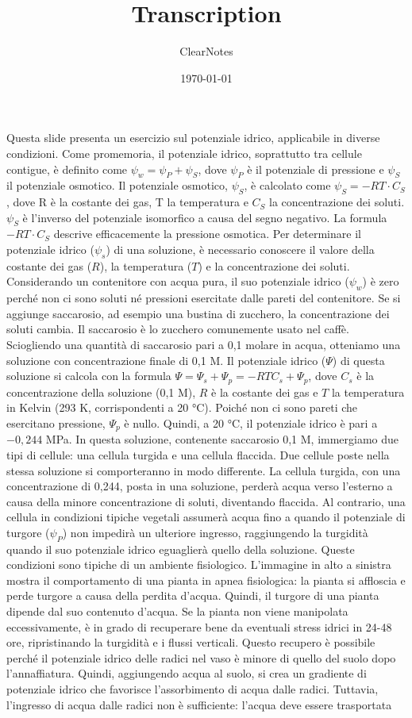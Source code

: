 \documentclass[11pt, a4paper]{article}
\title{Transcription}
\author{ClearNotes}
\date{\today}
\begin{document}
\maketitle
\begin{spacing}{1.15}
Questa slide presenta un esercizio sul potenziale idrico, applicabile in diverse condizioni. Come promemoria, il potenziale idrico, soprattutto tra cellule contigue, è definito come $\psi_w = \psi_P + \psi_S$, dove $\psi_P$ è il potenziale di pressione e $\psi_S$ il potenziale osmotico. Il potenziale osmotico, $\psi_S$, è calcolato come $\psi_S = -RT\cdot C_S$, dove R è la costante dei gas, T la temperatura e $C_S$ la concentrazione dei soluti.  $\psi_S$ è l'inverso del potenziale isomorfico a causa del segno negativo. La formula $-RT\cdot C_S$ descrive efficacemente la pressione osmotica. Per determinare il potenziale idrico ($\psi_s$) di una soluzione, è necessario conoscere il valore della costante dei gas ($R$), la temperatura ($T$) e la concentrazione dei soluti. Considerando un contenitore con acqua pura, il suo potenziale idrico ($\psi_w$) è zero perché non ci sono soluti né pressioni esercitate dalle pareti del contenitore. Se si aggiunge saccarosio, ad esempio una bustina di zucchero, la concentrazione dei soluti cambia. Il saccarosio è lo zucchero comunemente usato nel caffè. Sciogliendo una quantità di saccarosio pari a 0,1 molare in acqua, otteniamo una soluzione con concentrazione finale di 0,1 M. Il potenziale idrico ($\Psi$) di questa soluzione si calcola con la formula $\Psi = \Psi_s + \Psi_p = -RTC_s + \Psi_p$, dove $C_s$ è la concentrazione della soluzione (0,1 M), $R$ è la costante dei gas e $T$ la temperatura in Kelvin (293 K, corrispondenti a 20 °C).  Poiché non ci sono pareti che esercitano pressione, $\Psi_p$ è nullo. Quindi, a 20 °C, il potenziale idrico è pari a $-0,244$ MPa. In questa soluzione, contenente saccarosio 0,1 M, immergiamo due tipi di cellule: una cellula turgida e una cellula flaccida. Due cellule poste nella stessa soluzione si comporteranno in modo differente. La cellula turgida, con una concentrazione di 0,244, posta in una soluzione, perderà acqua verso l'esterno a causa della minore concentrazione di soluti, diventando flaccida. Al contrario, una cellula in condizioni tipiche vegetali assumerà acqua fino a quando il potenziale di turgore ($\psi_P$) non impedirà un ulteriore ingresso, raggiungendo la turgidità quando il suo potenziale idrico eguaglierà quello della soluzione. Queste condizioni sono tipiche di un ambiente fisiologico.  L'immagine in alto a sinistra mostra il comportamento di una pianta in apnea fisiologica: la pianta si affloscia e perde turgore a causa della perdita d'acqua. Quindi, il turgore di una pianta dipende dal suo contenuto d'acqua. Se la pianta non viene manipolata eccessivamente, è in grado di recuperare bene da eventuali stress idrici in 24-48 ore, ripristinando la turgidità e i flussi verticali. Questo recupero è possibile perché il potenziale idrico delle radici nel vaso è minore di quello del suolo dopo l'annaffiatura. Quindi, aggiungendo acqua al suolo, si crea un gradiente di potenziale idrico che favorisce l'assorbimento di acqua dalle radici. Tuttavia, l'ingresso di acqua dalle radici non è sufficiente: l'acqua deve essere trasportata 
\end{spacing}
\end{document}
